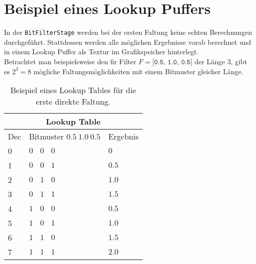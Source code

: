 \section{Beispiel eines Lookup Puffers}
\label{sec:example_lookup_buffer}
In der \texttt{BitFilterStage} werden bei der ersten Faltung keine echten Berechnungen durchgeführt. 
Stattdessen werden alle möglichen Ergebnisse vorab berechnet und in einem Lookup Puffer als Textur im Grafikspeicher hinterlegt.\\
Betrachtet man beispielsweise den \acs*{fir} Filter  $F = \texttt{[0.5, 1.0, 0.5]}$ der Länge $3$, gibt es $2^3 = 8$ mögliche Faltungsmöglichkeiten mit einem Bitmuster gleicher Länge.
\begin{table}[!h]
    \centering
    \begin{tabular}{ |p{2cm}|p{5cm}|p{5cm}| }
        \hline
        \multicolumn{3}{|c|}{Lookup Table}\\
        \hline
        Dec & Bitmuster \newline $0.5 \ 1.0 \ 0.5$ & Ergebnis\\
        \hline
        0 & $0 \ \ \ \ 0 \ \ \ \ 0$ & $0$\\
        1 & $0 \ \ \ \ 0 \ \ \ \ 1$ & $0.5$\\
        2 & $0 \ \ \ \ 1 \ \ \ \ 0$ & $1.0$\\
        3 & $0 \ \ \ \ 1 \ \ \ \ 1$ & $1.5$\\
        4 & $1 \ \ \ \ 0 \ \ \ \ 0$ & $0.5$\\
        5 & $1 \ \ \ \ 0 \ \ \ \ 1$ & $1.0$\\
        6 & $1 \ \ \ \ 1 \ \ \ \ 0$ & $1.5$\\
        7 & $1 \ \ \ \ 1 \ \ \ \ 1$ & $2.0$\\
        \hline
    \end{tabular}
    \caption{Beispiel eines Lookup Tables für die erste direkte Faltung.}
    \label{tab:lookup_example}
\end{table}

